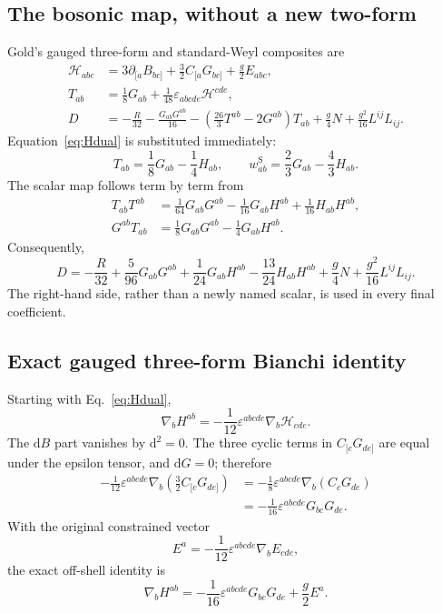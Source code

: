 \documentclass[11pt]{article}
\newcommand{\eps}{\varepsilon}
\newcommand{\std}{\mathrm S}
\begin{document}
\subsection{The bosonic map, without a new two-form}

Gold's gauged three-form and standard-Weyl composites are
\begin{align}
\mathcal H_{abc}&=3\partial_{[a}B_{bc]}
+\frac32C_{[a}G_{bc]}+\frac g2E_{abc},
\label{eq:H3def}\\
T_{ab}&=\frac18G_{ab}+\frac1{48}\eps_{abcde}\mathcal H^{cde},
\label{eq:Tmap0}\\
D&=-\frac{R}{32}-\frac{G_{ab}G^{ab}}{16}
-\left(\frac{26}{3}T^{ab}-2G^{ab}\right)T_{ab}
+\frac g4N+\frac{g^2}{16}L^{ij}L_{ij}.
\label{eq:Dmap0}
\end{align}
Equation~\eqref{eq:Hdual} is substituted immediately:
\begin{equation}
T_{ab}=\frac18G_{ab}-\frac14H_{ab},
\qquad
w_{ab}^{\std}=\frac23G_{ab}-\frac43H_{ab}.
\label{eq:wmap-expanded}
\end{equation}
The scalar map follows term by term from
\begin{align}
T_{ab}T^{ab}&=\frac1{64}G_{ab}G^{ab}
-\frac1{16}G_{ab}H^{ab}+\frac1{16}H_{ab}H^{ab},\\
G^{ab}T_{ab}&=\frac18G_{ab}G^{ab}-\frac14G_{ab}H^{ab}.
\end{align}
Consequently,
\begin{equation}
\boxed{
D=-\frac{R}{32}+\frac5{96}G_{ab}G^{ab}
+\frac1{24}G_{ab}H^{ab}-\frac{13}{24}H_{ab}H^{ab}
+\frac g4N+\frac{g^2}{16}L^{ij}L_{ij}.}
\label{eq:Dmap-expanded}
\end{equation}
The right-hand side, rather than a newly named scalar, is used in every final
coefficient.

\subsection{Exact gauged three-form Bianchi identity}
\label{sec:Bianchi}

Starting with Eq.~\eqref{eq:Hdual},
\begin{equation}
\nabla_bH^{ab}=-\frac1{12}\eps^{abcde}\nabla_b\mathcal H_{cde}.
\end{equation}
The $\mathrm dB$ part vanishes by $\mathrm d^2=0$.  The three cyclic terms
in $C_{[c}G_{de]}$ are equal under the epsilon tensor, and $\mathrm dG=0$;
therefore
\begin{align}
-\frac1{12}\eps^{abcde}\nabla_b
\left(\frac32C_{[c}G_{de]}\right)
&=-\frac18\eps^{abcde}\nabla_b(C_cG_{de})\\
&=-\frac1{16}\eps^{abcde}G_{bc}G_{de}.
\end{align}
With the original constrained vector
\begin{equation}
E^a=-\frac1{12}\eps^{abcde}\nabla_bE_{cde},
\end{equation}
the exact off-shell identity is
\begin{equation}
\boxed{
\nabla_bH^{ab}=-\frac1{16}\eps^{abcde}G_{bc}G_{de}
+\frac g2E^a.}
\label{eq:Bianchi-expanded}
\end{equation}
\end{document}
